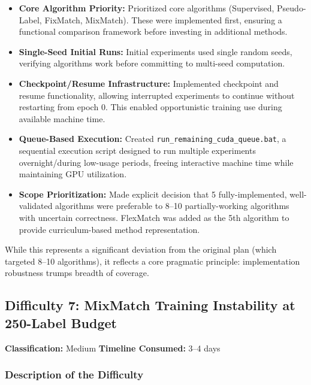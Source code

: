 \begin{itemize}
    \item \textbf{Core Algorithm Priority:} Prioritized core algorithms (Supervised, Pseudo-Label, FixMatch, MixMatch). These were implemented first, ensuring a functional comparison framework before investing in additional methods.
    
    \item \textbf{Single-Seed Initial Runs:} Initial experiments used single random seeds, verifying algorithms work before committing to multi-seed computation.
    
    \item \textbf{Checkpoint/Resume Infrastructure:} Implemented checkpoint and resume functionality, allowing interrupted experiments to continue without restarting from epoch 0. This enabled opportunistic training use during available machine time.
    
    \item \textbf{Queue-Based Execution:} Created \texttt{run\_remaining\_cuda\_queue.bat}, a sequential execution script designed to run multiple experiments overnight/during low-usage periods, freeing interactive machine time while maintaining GPU utilization.
    
    \item \textbf{Scope Prioritization:} Made explicit decision that 5 fully-implemented, well-validated algorithms were preferable to 8--10 partially-working algorithms with uncertain correctness. FlexMatch was added as the 5th algorithm to provide curriculum-based method representation.
\end{itemize}

While this represents a significant deviation from the original plan (which targeted 8--10 algorithms), it reflects a core pragmatic principle: implementation robustness trumps breadth of coverage.

\subsection{Difficulty 7: MixMatch Training Instability at 250-Label Budget}

\textbf{Classification:} Medium \quad \textbf{Timeline Consumed:} 3--4 days

\subsubsection{Description of the Difficulty}

